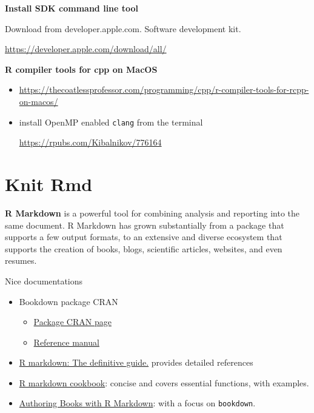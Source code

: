 \documentclass[
]{book}
\providecommand{\tightlist}{%
  \setlength{\itemsep}{0pt}\setlength{\parskip}{0pt}}
\theoremstyle{definition}
\theoremstyle{definition}
\theoremstyle{definition}
\theoremstyle{definition}
\theoremstyle{remark}
\begin{document}
\textbf{Install SDK command line tool}

Download from developer.apple.com. Software development kit.

\url{https://developer.apple.com/download/all/}

\textbf{R compiler tools for cpp on MacOS}

\begin{itemize}
\item
  \url{https://thecoatlessprofessor.com/programming/cpp/r-compiler-tools-for-rcpp-on-macos/}
\item
  install OpenMP enabled \texttt{clang} from the terminal

  \url{https://rpubs.com/Kibalnikov/776164}
\end{itemize}

\chapter{Knit Rmd}\label{knit-rmd}

\textbf{R Markdown} is a powerful tool for combining analysis and reporting into the same document. R Markdown has grown substantially from a package that supports a few output formats, to an extensive and diverse ecosystem that supports the creation of books, blogs, scientific articles, websites, and even resumes.

Nice documentations

\begin{itemize}
\tightlist
\item
  Bookdown package CRAN

  \begin{itemize}
  \tightlist
  \item
    \href{https://cran.r-project.org/web/packages/bookdown/index.html}{Package CRAN page}
  \item
    \href{https://cran.r-project.org/web/packages/bookdown/bookdown.pdf}{Reference manual}
  \end{itemize}
\item
  \href{https://bookdown.org/yihui/rmarkdown}{R markdown: The definitive guide.} provides detailed references
\item
  \href{https://bookdown.org/yihui/rmarkdown-cookbook/}{R markdown cookbook}: concise and covers essential functions, with examples.
\item
  \href{https://bookdown.org/yihui/bookdown/}{Authoring Books with R Markdown}: with a focus on \texttt{bookdown}.
\end{itemize}
\end{document}
